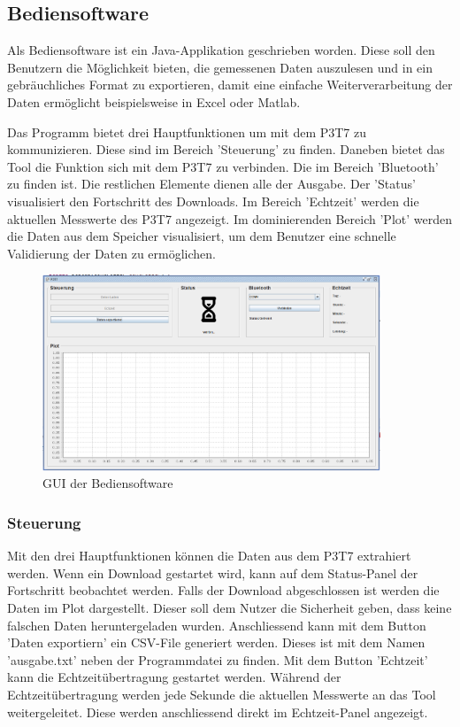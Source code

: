 \pagebreak
\subsection{Bediensoftware}%
Als Bediensoftware ist ein Java-Applikation geschrieben worden. Diese soll den Benutzern die Möglichkeit bieten, die gemessenen Daten auszulesen und in ein gebräuchliches Format zu exportieren, damit eine einfache Weiterverarbeitung der Daten ermöglicht beispielsweise in Excel oder Matlab.

Das Programm bietet drei Hauptfunktionen um mit dem P3T7 zu kommunizieren. Diese sind im Bereich 'Steuerung' zu finden. Daneben bietet das Tool die Funktion sich mit dem P3T7 zu verbinden. Die im Bereich 'Bluetooth' zu finden ist. Die restlichen Elemente dienen alle der Ausgabe. Der 'Status' visualisiert den Fortschritt des Downloads. Im Bereich 'Echtzeit' werden die aktuellen Messwerte des P3T7 angezeigt. Im dominierenden Bereich 'Plot' werden die Daten aus dem Speicher visualisiert, um dem Benutzer eine schnelle Validierung der Daten zu ermöglichen.

\begin{figure}[H]
\begin{center}
\includegraphics[width=0.9\textwidth]{images/Software_GUI.png}
\caption{GUI der Bediensoftware}
\end{center}
\end{figure}

\subsubsection*{Steuerung}

Mit den drei Hauptfunktionen können die Daten aus dem P3T7 extrahiert werden. Wenn ein Download gestartet wird, kann auf dem Status-Panel der Fortschritt beobachtet werden. Falls der Download abgeschlossen ist werden die Daten im Plot dargestellt. Dieser soll dem Nutzer die Sicherheit geben, dass keine falschen Daten heruntergeladen wurden. Anschliessend kann mit dem Button 'Daten exportiern' ein CSV-File generiert werden. Dieses ist mit dem Namen 'ausgabe.txt' neben der Programmdatei zu finden. Mit dem Button 'Echtzeit' kann die Echtzeitübertragung gestartet werden. Während der Echtzeitübertragung werden jede Sekunde die aktuellen Messwerte an das Tool weitergeleitet. Diese werden anschliessend direkt im Echtzeit-Panel angezeigt.

